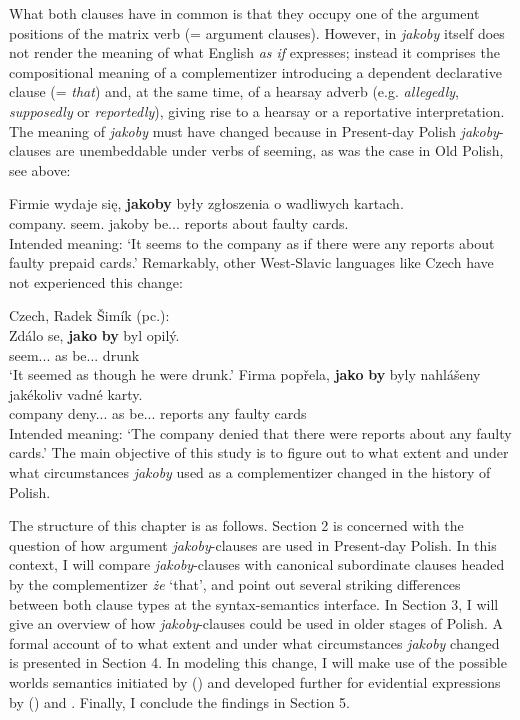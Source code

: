 \documentclass[output=paper
,modfonts
,nonflat]{langsci/langscibook}
\begin{document}
What both clauses have in common is that they occupy one of the argument positions of the matrix verb (= argument clauses). However, in  \emph{jakoby} itself does not render the meaning of what English \emph{as if} expresses; instead it comprises the compositional meaning of a complementizer introducing a dependent declarative clause (= \emph{that}) and, at the same time, of a hearsay adverb (e.g. \emph{allegedly}, \emph{supposedly} or \emph{reportedly}), giving rise to a hearsay or a reportative interpretation. The meaning of \emph{jakoby} must have changed because in Present-day Polish \emph{jakoby}-clauses are unembeddable under verbs of seeming, as was the case in Old Polish, see  above:


\ea \gll *Firmie wydaje się, \textbf{jakoby} były zgłoszenia o wadliwych kartach. \label{seem_jakoby} \\       
		company.{\dat} seem.{\thirdperson}{\sg} {} jakoby be.{\lptcp}.{\nvir}.{\pl} reports about faulty cards.{\loc} \\
\glt	Intended meaning: `It seems to the company as if there were any reports about faulty prepaid cards.'    
\z
Remarkably, other West-Slavic languages like Czech have not experienced this change: 

\ea Czech, Radek Šimík (pc.):\\
	\ea\gll	Zdálo se, \textbf{jako} \textbf{by} byl opilý. \\
		seem.{\lptcp}.{\sg}.{\n} {} as {\subj} be.{\lptcp}.{\sg}.{\masc} drunk \\
	\glt`It seemed as though he were drunk.'
	\ex\gll		*Firma popřela, \textbf{jako} \textbf{by} byly nahlášeny jakékoliv vadné karty. \label{nogo} \\
		company deny.{\lptcp}.{\sg}.{\fem} as {\subj} be.{\lptcp}.{\nvir}.{\pl} reports any faulty cards \\
	\glt Intended meaning: `The company denied that there were reports about any faulty cards.' 
\z\z
The main objective of this study is to figure out to what extent and under what circumstances \emph{jakoby} used as a complementizer changed in the history of Polish.

The structure of this chapter is as follows. Section 2 is concerned with the question of how argument \emph{jakoby}-clauses are used in Present-day Polish. In this context, I will compare \emph{jakoby}-clauses with canonical subordinate clauses headed by the complementizer \emph{że} `that', and point out several striking differences between both clause types at the syntax-semantics interface. In Section 3, I will give an overview of how \emph{jakoby}-clauses could be used in older stages of Polish. A formal account of to what extent and under what circumstances \emph{jakoby} changed is presented in Section 4. In modeling this change, I will make use of the possible worlds semantics initiated by \citeauthor{Kratzer1981} (\citeyear{Kratzer1981, Kratzer1991, Kratzer2012}) and developed further for evidential expressions by \citeauthor{Faller2002} (\citeyear{Faller2002, Faller2011}) and \textcite{Lisa-Matthewson-Davis2017}.  Finally, I conclude the findings in Section 5. 
\end{document}
